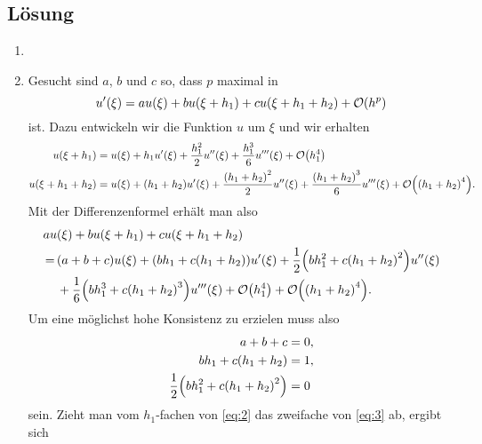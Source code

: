 \documentclass{exercise}
\begin{document}
    \subsection*{Lösung}
    \begin{enumerate}
        \item
        \item Gesucht sind \(a\), \(b\) und \(c\) so, dass \(p\) maximal in
        \[
        u'\parentheses*{\xi} = au\parentheses*{\xi} + bu\parentheses*{\xi + h_1} + cu\parentheses*{\xi + h_1 + h_2} + \mathcal{O}\parentheses*{h^p}
        \]
        ist.
        Dazu entwickeln wir die Funktion \(u\) um \(\xi\) und wir erhalten
        \begin{align*}
            u\parentheses*{\xi + h_1} &= u\parentheses*{\xi} + h_1 u'\parentheses*{\xi} + \frac{h_1^2}{2}u''\parentheses*{\xi} + \frac{h_1^3}{6}u'''\parentheses*{\xi} + \mathcal{O}\parentheses*{h_1^4}\\
            u\parentheses*{\xi + h_1 + h_2} &= u\parentheses*{\xi} + \parentheses*{h_1 + h_2}u'\parentheses*{\xi} + \frac{\parentheses*{h_1 + h_2}^2}{2}u''\parentheses*{\xi} + \frac{\parentheses*{h_1 + h_2}^3}{6}u'''\parentheses*{\xi} + \mathcal{O}\parentheses*{\parentheses*{h_1 + h_2}^4}.
        \end{align*}
        Mit der Differenzenformel erhält man also
        \begin{align*}
            au&\parentheses*{\xi} + bu\parentheses*{\xi + h_1} + cu\parentheses*{\xi + h_1 + h_2}\\
            =\, &\parentheses*{a + b + c}u\parentheses*{\xi} + \parentheses*{bh_1 + c\parentheses*{h_1 + h_2}}u'\parentheses*{\xi} + \frac{1}{2}\parentheses*{bh_1^2 + c\parentheses*{h_1 + h_2}^2}u''\parentheses*{\xi}\\
            &+\frac{1}{6}\parentheses*{bh_1^3 + c\parentheses*{h_1 + h_2}^3}u'''\parentheses*{\xi} + \mathcal{O}\parentheses*{h_1^4} + \mathcal{O}\parentheses*{\parentheses*{h_1 + h_2}^4}.
        \end{align*}
        Um eine möglichst hohe Konsistenz zu erzielen muss also
        \begin{align}
            a + b + c &= 0,\label{eq:1}\\
            bh_1 + c\parentheses*{h_1 + h_2} &= 1,\label{eq:2}\\
            \frac{1}{2}\parentheses*{bh_1^2 + c\parentheses*{h_1 + h_2}^2} &= 0\label{eq:3}
        \end{align}
        sein.
        Zieht man vom \(h_1\)-fachen von \eqref{eq:2} das zweifache von \eqref{eq:3} ab, ergibt sich

\end{enumerate}
\end{document}
